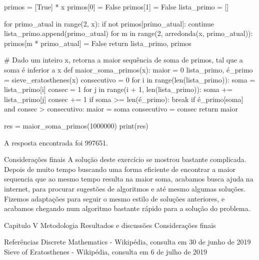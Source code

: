                 primos = [True] * x
                primos[0] = False
                primos[1] = False
                lista_primo = []

                for primo_atual in range(2, x):
                    if not primos[primo_atual]:
                        continue
                    lista_primo.append(primo_atual)
                    for m in range(2, arredonda(x, primo_atual)):
                        primos[m * primo_atual] = False
                return lista_primo, primos

            # Dado um inteiro x, retorna a maior sequência de soma de primos, tal que a soma é inferior a x
            def maior_soma_primos(x):
                maior = 0
                lista_primo, é_primo = sieve_eratosthenes(x)
                consecutivo = 0
                for i in range(len(lista_primo)):
                    soma = lista_primo[i]
                    consec = 1
                    for j in range(i + 1, len(lista_primo)):
                        soma += lista_primo[j]
                        consec += 1
                        if soma >= len(é_primo):
                            break
                        if é_primo[soma] and consec > consecutivo:
                            maior = soma
                            consecutivo = consec
                return maior

            res = maior_soma_primos(1000000)
            print(res)

            A resposta encontrada foi 997651.

        Considerações finais
            A solução deste exercício se mostrou bastante complicada. Depois de muito tempo buscando uma forma eficiente de encontrar a maior sequencia que ao mesmo tempo resulta na maior soma, acabamos busca ajuda na internet, para procurar sugestões de algoritmos e até mesmo algumas soluções. Fizemos adaptações para seguir o mesmo estilo de soluções anteriores, e acabamos chegando num algoritmo bastante rápido para a solução do problema.

Capitulo V
    Metodologia
    Resultados e discussões
    Considerações finais

Referências
    Discrete Mathematics - Wikipédia, consulta em 30 de junho de 2019
    Sieve of Eratosthenes - Wikipédia, consulta em 6 de julho de 2019